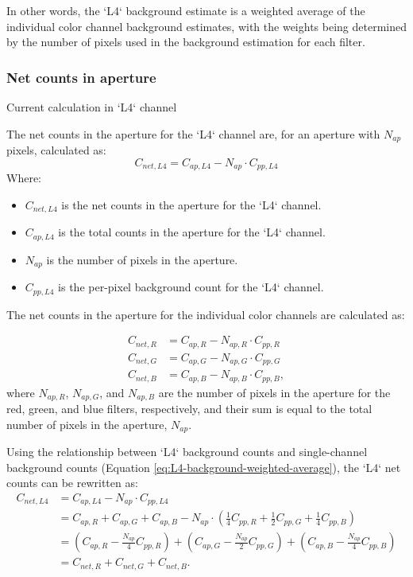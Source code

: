\documentclass[12pt]{article}
\begin{document}
In other words, the `L4` background estimate is a weighted average of the individual color channel background estimates, with the weights being determined by the number of pixels used in the background estimation for each filter.

\subsubsection{Net counts in aperture}

Current calculation in `L4` channel

The net counts in the aperture for the `L4` channel are, for an aperture with $N_{ap}$ pixels, calculated as:
\begin{equation}
C_{net, L4} = C_{ap, L4} - N_{ap} \cdot C_{pp, L4}
\end{equation}
Where:
\begin{itemize}
    \item $C_{net, L4}$ is the net counts in the aperture for the `L4` channel.
    \item $C_{ap, L4}$ is the total counts in the aperture for the `L4` channel.
    \item $N_{ap}$ is the number of pixels in the aperture.
    \item $C_{pp, L4}$ is the per-pixel background count for the `L4` channel.
\end{itemize}

The net counts in the aperture for the individual color channels are calculated as:

\begin{align}
C_{net, R} &= C_{ap, R} - N_{ap, R} \cdot C_{pp, R}\\
C_{net, G} &= C_{ap, G} - N_{ap, G} \cdot C_{pp, G}\\
C_{net, B} &= C_{ap, B} - N_{ap, B} \cdot C_{pp, B},
\end{align}
where $N_{ap, R}$, $N_{ap, G}$, and $N_{ap, B}$ are the number of pixels in the aperture for the red, green, and blue filters, respectively, and their sum is equal to the total number of pixels in the aperture, $N_{ap}$.

Using the relationship  between `L4` background counts and single-channel background counts (Equation \ref{eq:L4-background-weighted-average}), the `L4` net counts can be rewritten as:
\begin{align}
C_{net, L4} &= C_{ap, L4} - N_{ap} \cdot C_{pp, L4} \\
            &= C_{ap, R} + C_{ap, G} + C_{ap, B} - N_{ap} \cdot \left( \frac{1}{4}C_{pp, R} + \frac{1}{2}C_{pp, G} + \frac{1}{4}C_{pp, B} \right) \\
            &= (C_{ap,R} -  \frac{N_{ap}}{4}C_{pp, R}) + (C_{ap, G} -  \frac{N_{ap}}{2}C_{pp, G}) + (C_{ap, B} -  \frac{N_{ap}}{4}C_{pp, B}) \\
            &= C_{net, R} + C_{net, G} + C_{net, B}.
\end{align}
\end{document}
